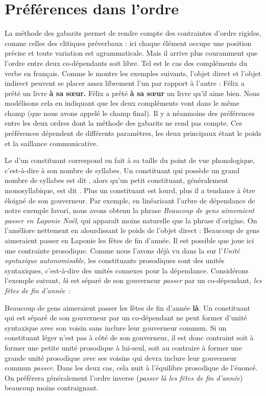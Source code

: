 \section{Préférences dans l’ordre}\label{sec:3.5.21}

La méthode des gabarits permet de rendre compte des contraintes d’ordre rigides, comme celles des clitiques préverbaux : ici chaque élément occupe une position précise et toute variation est agrammaticale. Mais il arrive plus couramment que l’ordre entre deux co-dépendants soit libre. Tel est le cas des compléments du verbe en français. Comme le montre les exemples suivants, l’objet direct et l’objet indirect peuvent se placer assez librement l’un par rapport à l’autre :
\ea
    {Félix a prêté} un livre \textbf{{à sa sœur.}}
\z
\ea
    {Félix a prêté} \textbf{{à sa sœur}} un livre qu’il aime bien.
\z
Nous modélisons cela en indiquant que les deux compléments vont dans le même champ (que nous avons appelé le champ final). Il y a néanmoins des préférences entre les deux ordres dont la méthode des gabarits ne rend pas compte. Ces préférences dépendent de différents paramètres, les deux principaux étant le poids et la saillance communicative.

Le  d’un constituant correspond en fait à sa taille du point de vue phonologique, c’est-à-dire à son nombre de syllabes. Un constituant qui possède un grand nombre de syllabes est dit , alors qu’un petit constituant, généralement monosyllabique, est dit . Plus un constituant est lourd, plus il a tendance à être éloigné de son gouverneur. Par exemple, en linéarisant l’arbre de dépendance de notre exemple favori, nous avons obtenu la phrase \textit{Beaucoup de gens aimeraient passer en Laponie Noël}, qui apparaît moins naturelle que la phrase d’origine. On l’améliore nettement en alourdissant le poids de l’objet direct :
\ea
    {Beaucoup de gens aimeraient passer en Laponie les fêtes de fin d’année}.
\z
Il est possible que joue ici une contrainte prosodique. Comme nous l’avons déjà vu dans la  sur l’\textit{Unité syntaxique autonomisable}, les constituants prosodiques sont des unités syntaxiques, c’est-à-dire des unités connexes pour la dépendance. Considérons l’exemple suivant, \textit{là} est séparé de son gouverneur \textit{passer} par un co-dépendant, \textit{les fêtes de fin d’année~}:

\ea
{Beaucoup de gens aimeraient passer les fêtes de fin d’année} \textbf{{là}}.
\z
Un constituant qui est séparé de son gouverneur par un co-dépendant ne peut former d’unité syntaxique avec son voisin sans inclure leur gouverneur commun. Si un constituant léger n’est pas à côté de son gouverneur, il est donc contraint soit à former une petite unité prosodique à lui-seul, soit au contraire à former une grande unité prosodique avec ses voisins qui devra inclure leur gouverneur commun \textit{passer}. Dans les deux cas, cela nuit à l’équilibre prosodique de l’énoncé. On préférera généralement l’ordre inverse (\textit{passer là les fêtes de fin d’année}) beaucoup moins contraignant.

